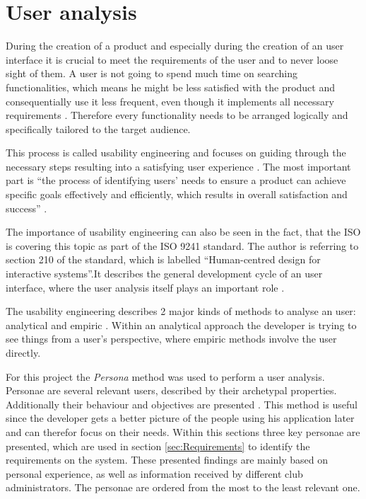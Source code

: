 \section{User analysis}
\label{sec:UserAnalysis}

During the creation of a product and especially during the creation of an user interface it is crucial to meet the requirements of the user and to never loose sight of them. A user is not going to spend much time on searching functionalities, which means he might be less satisfied with the product and consequentially use it less frequent, even though it implements all necessary requirements \cite{Frank:2013aa}. Therefore every functionality needs to be arranged logically and specifically tailored to the target audience.

This process is called usability engineering and focuses on guiding through the necessary steps resulting into a satisfying user experience \cite{Nielsen:1993aa}. The most important part is \enquote{the process of identifying users’ needs to ensure a product can achieve specific goals effectively and efficiently, which results in overall satisfaction and success} \cite{Frank:2013aa}.

The importance of usability engineering can also be seen in the fact, that the \gls{ISO} is covering this topic as part of the ISO 9241 standard. The author is referring to section 210 of the standard, which is labelled \enquote{Human-centred design for interactive systems}.It describes the general development cycle of an user interface, where the user analysis itself plays an important role \cite[p. 13]{Gulzow:2015aa}.

The usability engineering describes 2 major kinds of methods to analyse an user: analytical and empiric \cite[p. 20]{Gulzow:2015aa}. Within an analytical approach the developer is trying to see things from a user's perspective, where empiric methods involve the user directly. 

For this project the \emph{Persona} method was used to perform a user analysis. Personae are several relevant users, described by their archetypal properties. Additionally their behaviour and objectives are presented \cite[p. 30]{Gulzow:2015aa}. This method is useful since the developer gets a better picture of the people using his application later and can therefor focus on their needs. Within this sections three key personae are presented, which are used in section \vref{sec:Requirements} to identify the requirements on the system. These presented findings are mainly based on personal experience, as well as information received by different club administrators. The personae are ordered from the most to the least relevant one.

